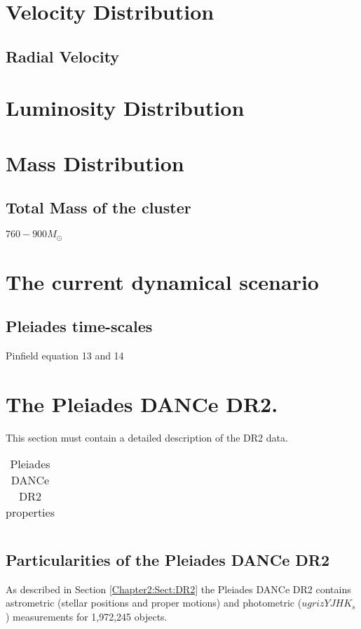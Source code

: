 \section{Velocity Distribution}
\subsection{Radial Velocity}

\section{Luminosity Distribution}

\section{Mass Distribution}


\subsection{Total Mass of the cluster}
\citet{Limber1961} $760-900 M_{\odot}$
\citet{Pinfield1998}
\section{The current dynamical scenario}
\subsection{Pleiades time-scales}
Pinfield equation 13 and 14

\section{The Pleiades DANCe DR2.}
\label{sect:DR2}
This section must contain a detailed description of the DR2 data.

\begin{table}[htdp]
\caption{Pleiades DANCe DR2 properties}
\begin{center}
\begin{tabular}{|c|c|}

\end{tabular}
\end{center}
\label{tab:DR2properties}
\end{table}%
\subsection{Particularities of the Pleiades DANCe DR2}
As described in Section \ref{Chapter2:Sect:DR2} the Pleiades DANCe DR2 contains astrometric (stellar positions and proper motions) and photometric ($ugrizYJHK_s$) measurements for 1,972,245 objects. 



